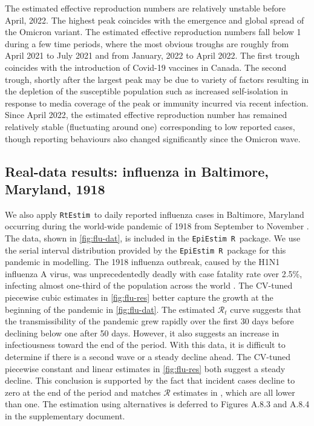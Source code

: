 \documentclass[10pt,letterpaper]{article}
\newcommand{\R}{\texttt{R}}
\def\RtEstim{\texttt{RtEstim}}
\def\EpiEstim{\texttt{EpiEstim}}
\def\calR{\mathcal{R}}
\newcommand{\citep}[1]{\cite{#1}}
\begin{document}
The estimated effective reproduction numbers are relatively unstable before April,
2022. The highest peak coincides with the emergence and global spread of the
Omicron variant. The estimated effective reproduction numbers fall below 1 during 
a few time periods, where the most obvious troughs are roughly from April 2021 to July 2021 and from January,
2022 to April 2022. The first trough coincides with the introduction of
Covid-19 vaccines in Canada. The second trough, shortly after the
largest peak may be due to variety of factors resulting in the depletion of the
susceptible population such as increased self-isolation in response to media
coverage of the peak or immunity incurred via recent infection. Since April
2022, the estimated effective reproduction number has remained relatively stable
(fluctuating around one) corresponding to low reported cases, though reporting
behaviours also changed significantly since the Omicron wave. 


\subsection{Real-data results: influenza in Baltimore, Maryland, 1918}

We also apply \RtEstim\ to daily reported influenza cases in Baltimore, Maryland
occurring during the world-wide pandemic of 1918 from September to November 
\citep{frost1919influenza}. The
data, shown in \autoref{fig:flu-dat}, is included in the \EpiEstim\ \R\ package.
We use the serial interval distribution provided by the \EpiEstim\ \R\ package for
this pandemic in modelling. 
The 1918 influenza outbreak, caused by the H1N1 influenza A virus, was
unprecedentedly deadly with case fatality rate over 2.5\%, infecting almost
one-third of the population across the world \citep{taubenberger20061918}. The
CV-tuned piecewise cubic estimates in \autoref{fig:flu-res} better capture the
growth at the beginning of the pandemic in \autoref{fig:flu-dat}. The estimated
$\calR_t$ curve suggests that the transmissibility of the pandemic grew rapidly
over the first 30 days before declining below one after 50 days. However, it
also suggests an increase in infectiousness toward the end of the period. With
this data, it is difficult to determine if there is a second wave or a steady
decline ahead. The CV-tuned piecewise constant and linear estimates in
\autoref{fig:flu-res} both suggest a steady decline. This conclusion is
supported by the fact that incident cases decline to zero at the end of the
period and matches $\calR$ estimates in \cite{cori2013new}, which are all lower
than one.
The estimation using alternatives is deferred to Figures A.8.3 and A.8.4 
in the supplementary document.
\end{document}
